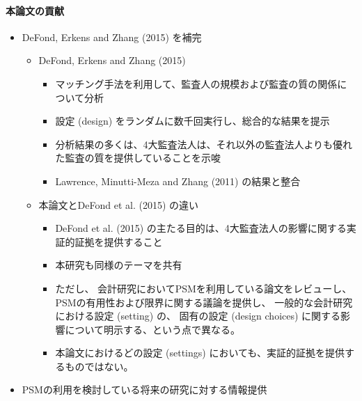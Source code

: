 \begin{itemize}
\paragraph{本論文の貢献}
\begin{itemize}
 \item DeFond, Erkens and Zhang (2015) を補完
       \begin{itemize}
        \item DeFond, Erkens and Zhang (2015)
              \begin{itemize}
               \item マッチング手法を利用して、監査人の規模および監査の質の関係について分析
               \item 設定 (design) をランダムに数千回実行し、総合的な結果を提示
               \item 分析結果の多くは、4大監査法人は、それ以外の監査法人よりも優れた監査の質を提供していることを示唆
               \item Lawrence, Minutti-Meza and Zhang (2011) の結果と整合
              \end{itemize}
        \item 本論文とDeFond et al. (2015) の違い
              \begin{itemize}
               \item DeFond et al. (2015) の主たる目的は、4大監査法人の影響に関する実証的証拠を提供すること
               \item 本研究も同様のテーマを共有
               \item ただし、
                     会計研究においてPSMを利用している論文をレビューし、
                     PSMの有用性および限界に関する議論を提供し、
                     一般的な会計研究における設定 (setting) の、
                     固有の設定 (design choices) に関する影響について明示する、という点で異なる。
               \item 本論文におけるどの設定 (settings) においても、実証的証拠を提供するものではない。
              \end{itemize}
       \end{itemize}
 \item PSMの利用を検討している将来の研究に対する情報提供
\end{itemize}


\end{itemize}
